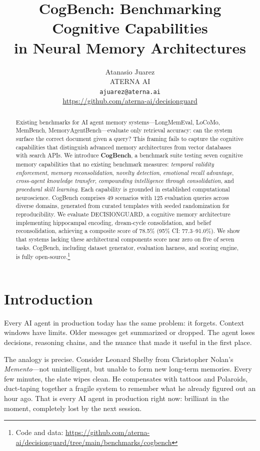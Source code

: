 \documentclass{article}
\title{CogBench: Benchmarking Cognitive Capabilities \\ in Neural Memory Architectures}
\author{
  Atanasio Juarez \\
  ATERNA AI \\
  \texttt{ajuarez@aterna.ai} \\
  \url{https://github.com/aterna-ai/decisionguard}
}
\date{}
\begin{document}
\maketitle

\begin{abstract}
Existing benchmarks for AI agent memory systems---LongMemEval, LoCoMo, MemBench, MemoryAgentBench---evaluate only retrieval accuracy: can the system surface the correct document given a query? This framing fails to capture the cognitive capabilities that distinguish advanced memory architectures from vector databases with search APIs. We introduce \textbf{CogBench}, a benchmark suite testing seven cognitive memory capabilities that no existing benchmark measures: \emph{temporal validity enforcement}, \emph{memory reconsolidation}, \emph{novelty detection}, \emph{emotional recall advantage}, \emph{cross-agent knowledge transfer}, \emph{compounding intelligence through consolidation}, and \emph{procedural skill learning}. Each capability is grounded in established computational neuroscience. CogBench comprises 49 scenarios with 125 evaluation queries across diverse domains, generated from curated templates with seeded randomization for reproducibility. We evaluate DECISIONGUARD, a cognitive memory architecture implementing hippocampal encoding, dream-cycle consolidation, and belief reconsolidation, achieving a composite score of 78.5\% (95\% CI: 77.3--91.0\%). We show that systems lacking these architectural components score near zero on five of seven tasks. CogBench, including dataset generator, evaluation harness, and scoring engine, is fully open-source.\footnote{Code and data: \url{https://github.com/aterna-ai/decisionguard/tree/main/benchmarks/cogbench}}
\end{abstract}

\section{Introduction}
\label{sec:intro}

Every AI agent in production today has the same problem: it forgets. Context windows have limits. Older messages get summarized or dropped. The agent loses decisions, reasoning chains, and the nuance that made it useful in the first place.

The analogy is precise. Consider Leonard Shelby from Christopher Nolan's \emph{Memento}---not unintelligent, but unable to form new long-term memories. Every few minutes, the slate wipes clean. He compensates with tattoos and Polaroids, duct-taping together a fragile system to remember what he already figured out an hour ago. That is every AI agent in production right now: brilliant in the moment, completely lost by the next session.
\end{document}
